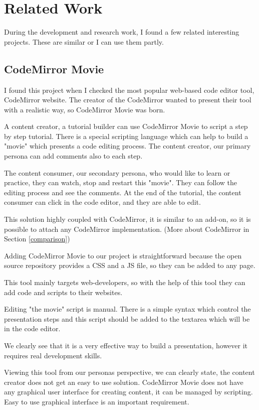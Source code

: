 \documentclass[11pt, a4paper, oneside, openright, medskipamount]{report}
\begin{document}
\chapter{Related Work}

During the development and research work, I found a few related interesting projects. These are similar or I can use them partly.

\section{CodeMirror Movie}

I found this project when I checked the most popular web-based code editor tool, CodeMirror website. The creator of the CodeMirror wanted to present their tool with a realistic way, so CodeMirror Movie was born. \cite{cm-movie}

A content creator, a tutorial builder can use CodeMirror Movie to script a step by step tutorial. There is a special scripting language which can help to build a "movie" which presents a code editing process. The content creator, our primary persona can add comments also to each step.

The content consumer, our secondary persona, who would like to learn or practice, they can watch, stop and restart this "movie". They can follow the editing process and see the comments. At the end of the tutorial, the content consumer can click in the code editor, and they are able to edit.

This solution highly coupled with CodeMirror, it is similar to an add-on, so it is possible to attach any CodeMirror implementation. (More about CodeMirror in Section \ref{comparison})

Adding CodeMirror Movie to our project is straightforward because the open source repository provides a CSS and a JS file, so they can be added to any page.

This tool mainly targets web-developers, so with the help of this tool they can add code and scripts to their websites.

Editing "the movie" script is manual. There is a simple syntax which control the presentation steps and this script should be added to the textarea which will be in the code editor.

We clearly see that it is a very effective way to build a presentation, however it requires real development skills.

Viewing this tool from our personas perspective, we can clearly state, the content creator does not get an easy to use solution. CodeMirror Movie does not have any graphical user interface for creating content, it can be managed by scripting. Easy to use graphical interface is an important requirement.
\end{document}
